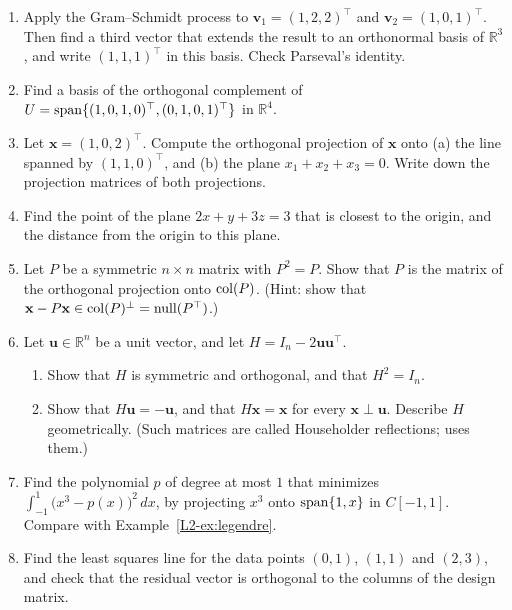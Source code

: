 \begin{enumerate}[leftmargin=*]
\begin{enumerate}[label=(\alph*)]
        \item The planes $x + y + z = 3$ and $x - y + z = 5$ intersect in a line $\ell$. Find an equation of the plane through the origin that is perpendicular to $\ell$.
    \end{enumerate}
    \item \homework{} Apply the Gram--Schmidt process to $\mathbf{v}_1 = (1, 2, 2)^\top$ and $\mathbf{v}_2 = (1, 0, 1)^\top$. Then find a third vector that extends the result to an orthonormal basis of $\mathbb{R}^3$, and write $(1, 1, 1)^\top$ in this basis. Check Parseval's identity.
    \item Find a basis of the orthogonal complement of $U = \operatorname{span}\{(1, 0, 1, 0)^\top, (0, 1, 0, 1)^\top\}$ in $\mathbb{R}^4$.
    \item \homework{} Let $\mathbf{x} = (1, 0, 2)^\top$. Compute the orthogonal projection of $\mathbf{x}$ onto (a) the line spanned by $(1, 1, 0)^\top$, and (b) the plane $x_1 + x_2 + x_3 = 0$. Write down the projection matrices of both projections.
    \item Find the point of the plane $2x + y + 3z = 3$ that is closest to the origin, and the distance from the origin to this plane.
    \item Let $P$ be a symmetric $n \times n$ matrix with $P^2 = P$. Show that $P$ is the matrix of the orthogonal projection onto $\operatorname{col}(P)$. (Hint: show that $\mathbf{x} - P\mathbf{x} \in \operatorname{col}(P)^\perp = \operatorname{null}(P^\top)$.)
    \item Let $\mathbf{u} \in \mathbb{R}^n$ be a unit vector, and let $H = I_n - 2\mathbf{u}\mathbf{u}^\top$.
    \begin{enumerate}[label=(\alph*)]
        \item Show that $H$ is symmetric and orthogonal, and that $H^2 = I_n$.
        \item Show that $H\mathbf{u} = -\mathbf{u}$, and that $H\mathbf{x} = \mathbf{x}$ for every $\mathbf{x} \perp \mathbf{u}$. Describe $H$ geometrically. (Such matrices are called Householder reflections;  uses them.)
    \end{enumerate}
    \item\label{L2-ex2:best-poly} Find the polynomial $p$ of degree at most $1$ that minimizes $\int_{-1}^1 \big(x^3 - p(x)\big)^2 \, dx$, by projecting $x^3$ onto $\operatorname{span}\{1, x\}$ in $C[-1, 1]$. Compare with Example~\ref{L2-ex:legendre}.
    \item \homework{} Find the least squares line for the data points $(0, 1)$, $(1, 1)$ and $(2, 3)$, and check that the residual vector is orthogonal to the columns of the design matrix.

\end{enumerate}
